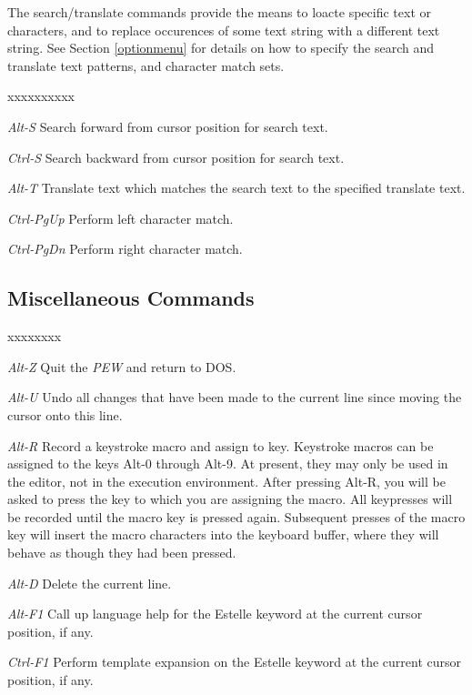 The search/translate commands provide the means to loacte specific
text or characters, and to replace occurences of some text string
with a different text string. 
See Section \ref{optionmenu} for details on how to specify the search and
translate text patterns, and character match sets.

\begin{describe}{xxxxxxxxxx}
\item[\em Alt-S]Search forward from cursor position for search text.
\item[\em Ctrl-S]Search backward from cursor position for search
text.
\item[\em Alt-T]Translate text which matches the search text to the
specified translate text.
\item[\em Ctrl-PgUp]Perform left character match.
\item[\em Ctrl-PgDn]Perform right character match.
\end{describe}

\subsection[Miscellaneous Commands]{Miscellaneous Commands}

\begin{describe}{xxxxxxxx}
\item[\em Alt-Z]Quit the {\em PEW} and return to DOS.
\item[\em Alt-U]Undo all changes that have been made to the current line
since moving the cursor onto this line.
\item[\em Alt-R]Record a keystroke macro and assign to key. Keystroke
macros can be assigned to the keys Alt-0 through Alt-9. At present,
they may only be used in the editor, not in the execution
environment. After pressing Alt-R, you will be asked to press the key
to which you are assigning the macro. All keypresses will
be recorded until the macro key is pressed again. Subsequent presses
of the macro key will insert the macro characters into the keyboard
buffer, where they will behave as though they had been pressed.
\item[\em Alt-D]Delete the current line.
\item[\em Alt-F1]Call up language help for the Estelle keyword at the
current cursor position, if any.
\item[\em Ctrl-F1]Perform template expansion on the Estelle keyword
at the current cursor position, if any.
\end{describe}

